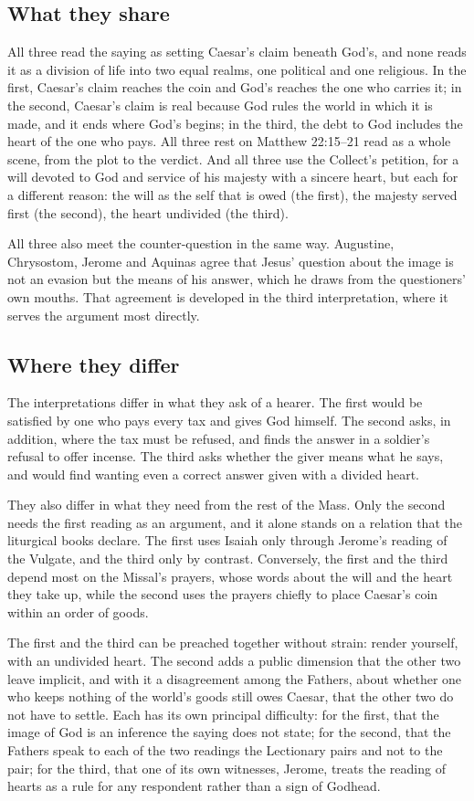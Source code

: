 \subsection{What they share}

All three read the saying as setting Caesar's claim beneath God's, and none
reads it as a division of life into two equal realms, one political and one
religious. In the first, Caesar's claim reaches the coin and God's reaches the
one who carries it; in the second, Caesar's claim is real because God rules
the world in which it is made, and it ends where God's begins; in the third,
the debt to God includes the heart of the one who pays. All three rest on
Matthew 22:15--21 read as a whole scene, from the plot to the verdict. And all
three use the Collect's petition, for a will devoted to God and service of his
majesty with a sincere heart, but each for a different reason: the will as the
self that is owed (the first), the majesty served first (the second), the heart
undivided (the third).

All three also meet the counter-question in the same way. Augustine,
Chrysostom, Jerome and Aquinas agree that Jesus' question about the image is
not an evasion but the means of his answer, which he draws from the
questioners' own mouths. That agreement is developed in the third
interpretation, where it serves the argument most directly.

\subsection{Where they differ}

The interpretations differ in what they ask of a hearer. The first would be
satisfied by one who pays every tax and gives God himself. The second asks, in
addition, where the tax must be refused, and finds the answer in a soldier's
refusal to offer incense. The third asks whether the giver means what he says,
and would find wanting even a correct answer given with a divided heart.

They also differ in what they need from the rest of the Mass. Only the second
needs the first reading as an argument, and it alone stands on a relation that
the liturgical books declare. The first uses Isaiah only through Jerome's
reading of the Vulgate, and the third only by contrast. Conversely, the first
and the third depend most on the Missal's prayers, whose words about the will
and the heart they take up, while the second uses the prayers chiefly to place
Caesar's coin within an order of goods.

The first and the third can be preached together without strain: render
yourself, with an undivided heart. The second adds a public dimension that the
other two leave implicit, and with it a disagreement among the Fathers, about
whether one who keeps nothing of the world's goods still owes Caesar, that
the other two do not have to settle.
Each has its own principal difficulty: for the first, that the image of God is
an inference the saying does not state; for the second, that the Fathers speak to each
of the two readings the Lectionary pairs and not to the pair; for the third, that one of its own
witnesses, Jerome, treats the reading of hearts as a rule for any respondent
rather than a sign of Godhead.

